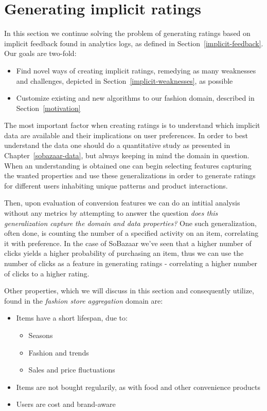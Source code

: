 
\section{Generating implicit ratings}
\label{implementation-implicit}

In this section we continue solving the problem of generating ratings based on
implicit feedback found in analytics logs, as defined in
Section~\ref{implicit-feedback}. Our goals are two-fold:

\begin{itemize}
  \item Find novel ways of creating implicit ratings, remedying as many
  weaknesses and challenges, depicted in Section~\ref{implicit-weaknesses}, as
  possible
  \item Customize existing and new algorithms to our fashion domain, described
  in Section~\ref{motivation}
\end{itemize}

The most important factor when creating ratings is to understand which implicit
data are available and their implications on user preferences. In order to best
understand the data one should do a quantitative study as presented in
Chapter~\ref{sobazaar-data}, but always keeping in mind the domain in question.
When an understanding is obtained one can begin selecting features capturing
the wanted properties and use these generalizations in order to generate
ratings for different users inhabiting unique patterns and product
interactions.

Then, upon evaluation of conversion features we can do an intitial analysis
without any metrics by attempting to answer the question \textit{does this
generalization capture the domain and data properties?} 
One such generalization, often done, is counting the number of a specified
activity on an item, correlating it with preference. In the case of SoBazaar
we've seen that a higher number of clicks yields a higher probability of
purchasing an item, thus we can use the number of clicks as a feature in
generating ratings - correlating a higher number of clicks to a higher rating.

Other properties, which we will discuss in this section and consequently
utilize, found in the \textit{fashion store aggregation} domain are:

\begin{itemize}
  \item Items have a short lifespan, due to:
  \begin{itemize}
    \item Seasons
    \item Fashion and trends
    \item Sales and price fluctuations
  \end{itemize}
  \item Items are not bought regularily, as with food and other convenience
  products
  \item Users are cost and brand-aware
\end{itemize}

